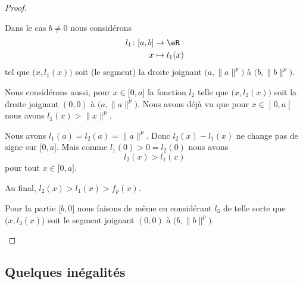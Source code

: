 \begin{proof}
\begin{subproof}
    \item[Les cordes passant au-dessus de zéro]

        Dans le cas \( b\neq 0\) nous considérons
        \begin{equation}
            \begin{aligned}
                l_1\colon \mathopen[ a , b \mathclose]  & \to \eR     \\
                                      x                 & \mapsto l_1(x)
            \end{aligned}
        \end{equation}
        tel que \( \big( x,l_1(x) \big)\) soit (le segment) la droite joignant \( \big( a,\| a \|^p \big)\) à \( \big( b,\| b \|^p \big)\).

        Nous considérons aussi, pour \( x\in\mathopen[ 0 , a \mathclose]\) la fonction \( l_2\) telle que \( \big( x,l_2(x) \big)\) soit la droite joignant \( (0,0)\) à \( \big( a,\| a \|^p \big)\). Nous avons déjà vu que pour \( x\in \mathopen] 0 , a \mathclose[\) nous avons \( l_1(x)>\| x \|^p\).

        Nous avons \( l_1(a)=l_2(a)=\| a \|^p\). Donc \( l_2(x)-l_1(x)\) ne change pas de signe sur \( \mathopen[ 0 , a \mathclose]\). Mais comme \( l_1(0)>0=l_2(0)\) nous avons
        \begin{equation}
            l_2(x)>l_1(x)
        \end{equation}
        pour tout \( x\in \mathopen[ 0 , a \mathclose]\).

        Au final, \( l_2(x)>l_1(x)>f_p(x)\).

        Pour la partie \( \mathopen[ b , 0 \mathclose]\) nous faisons de même en considérant \( l_3\) de telle sorte que \( \big( x,l_3(x) \big)\) soit le segment joignant \( (0,0)\) à \( \big( b,\| b \|^p \big)\).
    \end{subproof}
\end{proof}

\subsection{Quelques inégalités}

